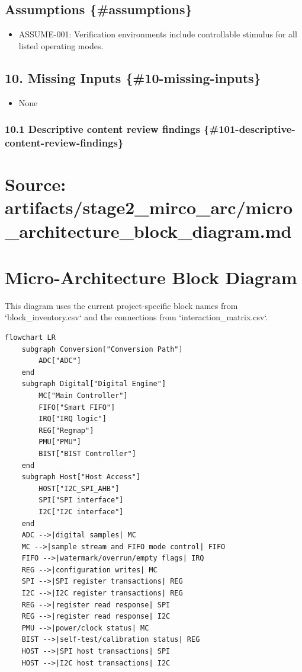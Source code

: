 \documentclass[11pt]{article}
\begin{document}
\subsection{Assumptions \{\#assumptions\}}


\begin{itemize}
\item ASSUME-001: Verification environments include controllable stimulus for all listed operating modes.
\end{itemize}


\subsection{10. Missing Inputs \{\#10-missing-inputs\}}


\begin{itemize}
\item None
\end{itemize}

\subsubsection{10.1 Descriptive content review findings \{\#101-descriptive-content-review-findings\}}










\section*{Source: artifacts/stage2\_mirco\_arc/micro\_architecture\_block\_diagram.md}

\section{Micro-Architecture Block Diagram}


This diagram uses the current project-specific block names from `block\_inventory.csv` and the connections from `interaction\_matrix.csv`.

\begin{verbatim}
flowchart LR
    subgraph Conversion["Conversion Path"]
        ADC["ADC"]
    end
    subgraph Digital["Digital Engine"]
        MC["Main Controller"]
        FIFO["Smart FIFO"]
        IRQ["IRQ logic"]
        REG["Regmap"]
        PMU["PMU"]
        BIST["BIST Controller"]
    end
    subgraph Host["Host Access"]
        HOST["I2C_SPI_AHB"]
        SPI["SPI interface"]
        I2C["I2C interface"]
    end
    ADC -->|digital samples| MC
    MC -->|sample stream and FIFO mode control| FIFO
    FIFO -->|watermark/overrun/empty flags| IRQ
    REG -->|configuration writes| MC
    SPI -->|SPI register transactions| REG
    I2C -->|I2C register transactions| REG
    REG -->|register read response| SPI
    REG -->|register read response| I2C
    PMU -->|power/clock status| MC
    BIST -->|self-test/calibration status| REG
    HOST -->|SPI host transactions| SPI
    HOST -->|I2C host transactions| I2C
\end{verbatim}
\end{document}
